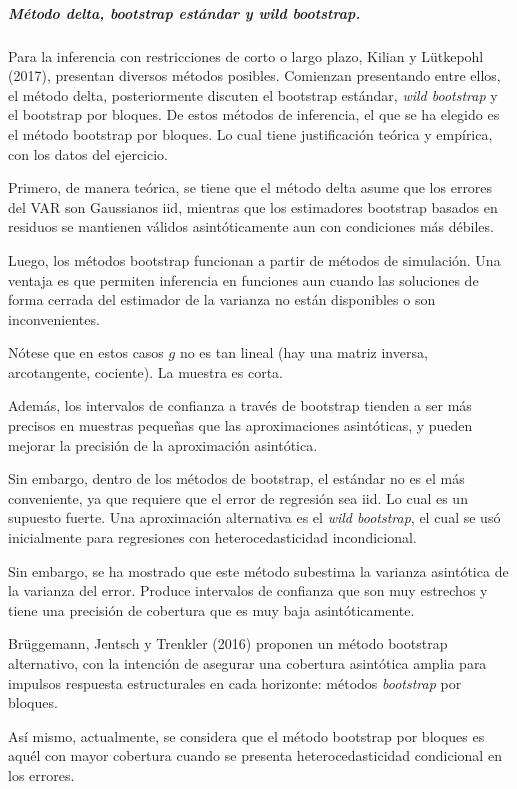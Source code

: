 \documentclass[12pt,letterpaper]{article}
\begin{document}
\subparagraph{Método delta, bootstrap estándar y \textit{wild bootstrap}.}
Para la inferencia con restricciones de corto o largo plazo, Kilian y Lütkepohl (2017), presentan diversos métodos posibles.
Comienzan presentando entre ellos, el método delta, posteriormente discuten el bootstrap estándar, \textit{wild bootstrap} y el bootstrap por bloques.
De estos métodos de inferencia, el que se ha elegido es el método bootstrap por bloques. Lo cual tiene justificación teórica y empírica, con los datos del ejercicio.

Primero, de manera teórica, se tiene que el método delta asume que los errores del VAR son Gaussianos iid, mientras que los estimadores bootstrap basados en residuos se mantienen válidos asintóticamente aun con condiciones más débiles.

Luego, los métodos bootstrap funcionan a partir de métodos de simulación. Una ventaja es que permiten inferencia en funciones aun cuando las soluciones de forma cerrada del estimador de la varianza no están disponibles o son inconvenientes.

Nótese que en estos casos $g$ no es tan lineal (hay una matriz inversa, arcotangente, cociente). La muestra es corta.

Además, los intervalos de confianza a través de bootstrap tienden a ser más precisos en muestras pequeñas que las aproximaciones asintóticas, y pueden mejorar la precisión de la aproximación asintótica.

Sin embargo, dentro de los métodos de bootstrap, el estándar no es el más conveniente, ya que requiere que el error de regresión sea iid. Lo cual es un supuesto fuerte. Una aproximación alternativa es el \textit{wild bootstrap}, el cual se usó inicialmente para regresiones con heterocedasticidad incondicional.

Sin embargo, se ha mostrado que este método subestima la varianza asintótica de la varianza del error. Produce intervalos de confianza que son muy estrechos y tiene una precisión de cobertura que es muy baja asintóticamente.

Brüggemann, Jentsch y Trenkler (2016) proponen un método bootstrap alternativo, con la intención de asegurar una cobertura asintótica amplia para impulsos respuesta estructurales en cada horizonte: métodos \textit{bootstrap} por bloques.

Así mismo, actualmente, se considera que el método bootstrap por bloques es aquél con mayor cobertura cuando se presenta heterocedasticidad condicional en los errores.
\end{document}
